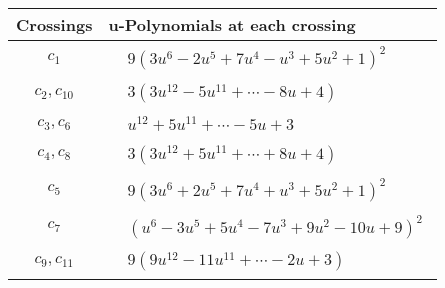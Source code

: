 \documentclass[1p]{elsarticle_modified}
\theoremstyle{definition}
\begin{document}
\begin{tabular}{m{50pt}|m{274pt}}
Crossings & \hspace{64pt}u-Polynomials at each crossing \\
\hline $$\begin{aligned}c_{1}\end{aligned}$$&$\begin{aligned}
&9(3 u^6-2 u^5+7 u^4- u^3+5 u^2+1)^2
\end{aligned}$\\
\hline $$\begin{aligned}c_{2},c_{10}\end{aligned}$$&$\begin{aligned}
&3(3 u^{12}-5 u^{11}+\cdots-8 u+4)
\end{aligned}$\\
\hline $$\begin{aligned}c_{3},c_{6}\end{aligned}$$&$\begin{aligned}
&u^{12}+5 u^{11}+\cdots-5 u+3
\end{aligned}$\\
\hline $$\begin{aligned}c_{4},c_{8}\end{aligned}$$&$\begin{aligned}
&3(3 u^{12}+5 u^{11}+\cdots+8 u+4)
\end{aligned}$\\
\hline $$\begin{aligned}c_{5}\end{aligned}$$&$\begin{aligned}
&9(3 u^6+2 u^5+7 u^4+u^3+5 u^2+1)^2
\end{aligned}$\\
\hline $$\begin{aligned}c_{7}\end{aligned}$$&$\begin{aligned}
&(u^6-3 u^5+5 u^4-7 u^3+9 u^2-10 u+9)^2
\end{aligned}$\\
\hline $$\begin{aligned}c_{9},c_{11}\end{aligned}$$&$\begin{aligned}
&9(9 u^{12}-11 u^{11}+\cdots-2 u+3)
\end{aligned}$\\
\hline
\end{tabular}\\~\\
\newpage\renewcommand{\arraystretch}{1}
\end{document}
